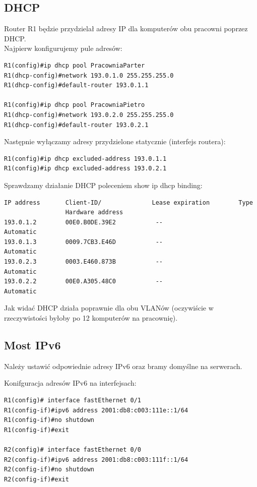 \documentclass[11pt,a4paper]{article}
\begin{document}

\subsection{DHCP}
Router R1 będzie przydzielał adresy IP dla komputerów obu pracowni poprzez DHCP.\\
Najpierw konfigurujemy pule adresów:
\begin{lstlisting}
R1(config)#ip dhcp pool PracowniaParter
R1(dhcp-config)#network 193.0.1.0 255.255.255.0
R1(dhcp-config)#default-router 193.0.1.1

R1(config)#ip dhcp pool PracowniaPietro
R1(dhcp-config)#network 193.0.2.0 255.255.255.0
R1(dhcp-config)#default-router 193.0.2.1
\end{lstlisting}
Następnie wyłączamy adresy przydzielone statycznie (interfejs routera):
\begin{lstlisting}
R1(config)#ip dhcp excluded-address 193.0.1.1
R1(config)#ip dhcp excluded-address 193.0.2.1
\end{lstlisting}
Sprawdzamy działanie DHCP poleceniem show ip dhcp binding:
\begin{lstlisting}
IP address       Client-ID/              Lease expiration        Type
                 Hardware address
193.0.1.2        00E0.B0DE.39E2           --                     Automatic
193.0.1.3        0009.7CB3.E46D           --                     Automatic
193.0.2.3        0003.E460.873B           --                     Automatic
193.0.2.2        00E0.A305.48C0           --                     Automatic
\end{lstlisting}
Jak widać DHCP działa poprawnie dla obu VLANów (oczywiście w rzeczywistości byłoby po 12 komputerów na pracownię).

\subsection{Most IPv6}

\noindent
Należy ustawić odpowiednie adresy IPv6 oraz bramy domyślne na serwerach.

Konifguracja adresów IPv6 na interfejsach:
\begin{lstlisting}
R1(config)# interface fastEthernet 0/1
R1(config-if)#ipv6 address 2001:db8:c003:111e::1/64
R1(config-if)#no shutdown
R1(config-if)#exit

R2(config)# interface fastEthernet 0/0
R2(config-if)#ipv6 address 2001:db8:c003:111f::1/64
R2(config-if)#no shutdown
R2(config-if)#exit
\end{lstlisting}
\end{document}
